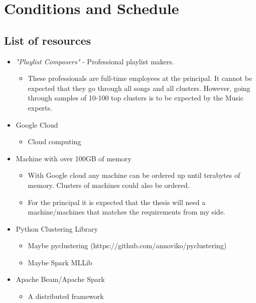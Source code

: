 \documentclass[a4paper,11pt]{article}
\begin{document}
\section{Conditions and Schedule}

\subsection{List of resources}

\begin{itemize}
\item
  \textit{"Playlist Composers"} - Professional playlist makers.

  \begin{itemize}

  \item
    These professionals are full-time employees at the principal. It
    cannot be expected that they go through all songs and all clusters.
    However, going through samples of 10-100 top clusters is to be
    expected by the Music experts.
  \end{itemize}
\item
  Google Cloud
  \begin{itemize}
    \item Cloud computing
  \end{itemize}
\item
  Machine with over 100GB of memory

  \begin{itemize}
  \item
    With Google cloud any machine can be ordered up until terabytes of
    memory. Clusters of machines could also be ordered.
  \item
    For the principal it is expected that the thesis will need a
    machine/machines that matches the requirements from my side.
  \end{itemize}
\item
  Python Clustering Library

  \begin{itemize}
  \item
    Maybe pyclustering (https://github.com/annoviko/pyclustering)
  \item
    Maybe Spark MLLib
  \end{itemize}
\item
  Apache Beam/Apache Spark

  \begin{itemize}
  \item
    A distributed framework
  \end{itemize}
\end{itemize}
\end{document}
